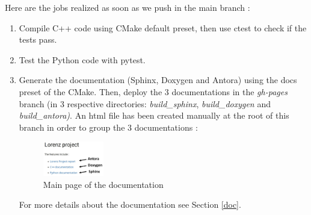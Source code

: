 	\noindent Here are the jobs realized as soon as we push in the main branch :
	\begin{enumerate}[label=\textbullet]
		\item Compile C++ code using CMake default preset, then use ctest to check if the tests pass.
		\item Test the Python code with pytest.
		\item Generate the documentation (Sphinx, Doxygen and Antora) using the docs preset of the CMake. Then, deploy the 3 documentations in the \textit{gh-pages} branch (in 3 respective directories: \textit{build\_sphinx}, \textit{build\_doxygen} and \textit{build\_antora)}. An html file has been created manually at the root of this branch in order to group the 3 documentations :
		\begin{figure}[H]
			\centering
			\includegraphics[width=0.25\textwidth]{"images/appendix/html_file.jpg"}
			\caption{Main page of the documentation}
			\label{html_file}
		\end{figure}
		For more details about the documentation see Section \ref{doc}.
	\end{enumerate}